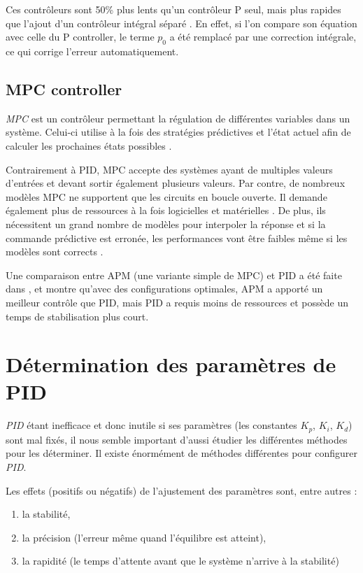 \documentclass[a4paper,10pt]{report}
\begin{document}
Ces contrôleurs sont 50\% plus lents qu'un contrôleur P seul, mais plus rapides que l'ajout d'un contrôleur intégral séparé \cite{svrcek2014real}.
En effet, si l'on compare son équation avec celle du P controller, le terme $p_0$ a été remplacé par une correction intégrale, ce qui corrige l'erreur automatiquement.

\subsection{MPC controller}
\emph{MPC} est un contrôleur permettant la régulation de différentes variables dans un système.
Celui-ci utilise à la fois des stratégies prédictives et l'état actuel afin de calculer les prochaines états possibles \cite{RICHALET1978413}.

Contrairement à PID, MPC accepte des systèmes ayant de multiples valeurs d'entrées et devant sortir également plusieurs valeurs.
Par contre, de nombreux modèles MPC ne supportent que les circuits en boucle ouverte.
Il demande également plus de ressources à la fois logicielles et matérielles \cite{saletovic2014apm}.
De plus, ils nécessitent un grand nombre de modèles pour interpoler la réponse et si la commande prédictive est erronée, les performances vont être faibles même si les modèles sont corrects \cite{Richalet2016}.

Une comparaison entre APM (une variante simple de MPC) et PID a été faite dans \cite{saletovic2014apm}, et montre qu'avec des configurations optimales, APM a apporté un meilleur contrôle que PID, mais PID a requis moins de ressources et possède un temps de stabilisation plus court.

\section{Détermination des paramètres de PID}

\emph{PID} étant inefficace et donc inutile si ses paramètres (les constantes $K_p$, $K_i$, $K_d$) sont mal fixés, il nous semble important d'aussi étudier les différentes méthodes pour les déterminer. Il existe énormément de méthodes différentes pour configurer \emph{PID}.

Les effets (positifs ou négatifs) de l'ajustement des paramètres sont, entre autres \cite{zhong2006pid} :
\begin{enumerate}
\item la stabilité,
\item la précision (l'erreur même quand l'équilibre est atteint),
\item la rapidité (le temps d'attente avant que le système n'arrive à la stabilité)
\end{enumerate}
\end{document}
